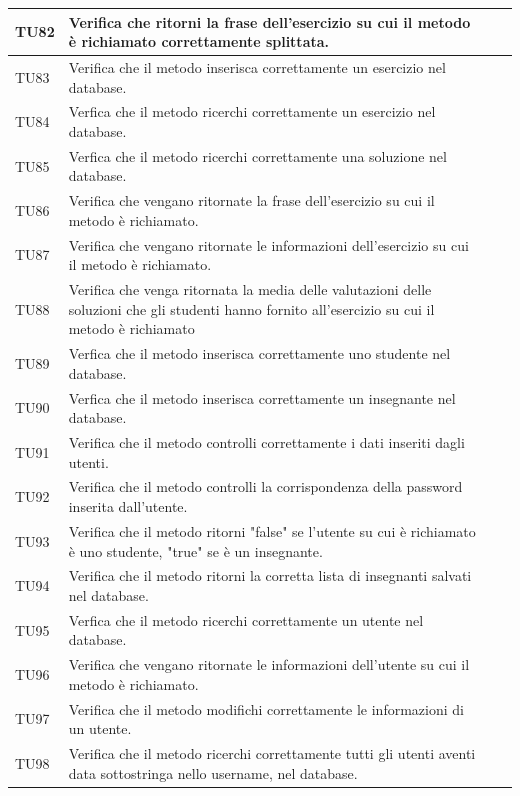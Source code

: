 \begin{longtable}{|>{\centering\arraybackslash}m{1.6cm}|>{\centering\arraybackslash}m{6.41cm}|>{\centering\arraybackslash}m{3.1cm}| c |}
		TU82 & Verifica che ritorni la frase dell'esercizio su cui il metodo è richiamato correttamente splittata.  \\ \hline
		\rowcolor{LightGray}
		TU83 & Verifica che il metodo inserisca correttamente un esercizio nel database.  \\ \hline
		TU84 & Verfica che il metodo ricerchi correttamente un esercizio nel database.  \\ \hline
		\rowcolor{LightGray}
		TU85 & Verfica che il metodo ricerchi correttamente una soluzione nel database.  \\ \hline
		TU86 & Verifica che vengano ritornate la frase dell'esercizio su cui il metodo è richiamato.  \\ \hline
		\rowcolor{LightGray}
		TU87 & Verifica che vengano ritornate le informazioni dell'esercizio su cui il metodo è richiamato.  \\ \hline
		TU88 & Verifica che venga ritornata la media delle valutazioni delle soluzioni che gli studenti hanno fornito all'esercizio su cui il metodo è richiamato  \\ \hline
		\rowcolor{LightGray}
		TU89 & Verfica che il metodo inserisca correttamente uno studente nel database.  \\ \hline
		TU90 & Verfica che il metodo inserisca correttamente un insegnante nel database.  \\ \hline
		\rowcolor{LightGray}
		TU91 & Verifica che il metodo controlli correttamente i dati inseriti dagli utenti.  \\ \hline
		TU92 & Verifica che il metodo controlli la corrispondenza della password inserita dall'utente.  \\ \hline
		\rowcolor{LightGray}
		TU93 & Verifica che il metodo ritorni "false" se l'utente su cui è richiamato è uno studente, "true" se è un insegnante.  \\ \hline
		TU94 & Verifica che il metodo ritorni la corretta lista di insegnanti salvati nel database.  \\ \hline
		\rowcolor{LightGray}
		TU95 & Verfica che il metodo ricerchi correttamente un utente nel database.  \\ \hline
		TU96 & Verifica che vengano ritornate le informazioni dell'utente su cui il metodo è richiamato.   \\ \hline
		\rowcolor{LightGray}
		TU97 & Verifica che il metodo modifichi correttamente le informazioni di un utente.  \\ \hline
		TU98 & Verifica che il metodo ricerchi correttamente tutti gli utenti aventi data sottostringa nello username, nel database.  \\ \hline

\end{longtable}
